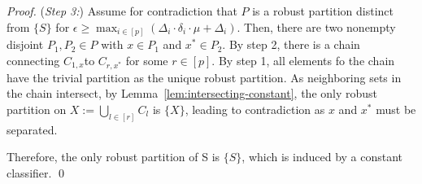 \begin{proof}
    (\emph{Step 3:})
    Assume for contradiction that $P$ is a robust partition distinct from $\{S\}$ for $\epsilon \geq \max_{i \in [p]}(\Delta_i \cdot \delta_i \cdot \mu + \Delta_i)$. Then, there are two nonempty disjoint $P_1, P_2 \in P$ with $x \in P_1$ and $x^* \in P_2$. By step 2, there is a chain connecting $C_{1,x}$to $C_{r,x^*}$ for some $r \in [p]$. By step 1, all elements fo the chain have the trivial partition as the unique robust partition. As neighboring sets in the chain intersect, by Lemma~\ref{lem:intersecting-constant}, the only robust partition on $X := \bigcup_{l \in [r]}C_l$ is $\{X\}$, leading to contradiction as $x$ and $x^*$ must be separated.

    Therefore, the only robust partition of S is $\{S\}$, which is induced by a constant classifier.
    \qed
\end{proof}